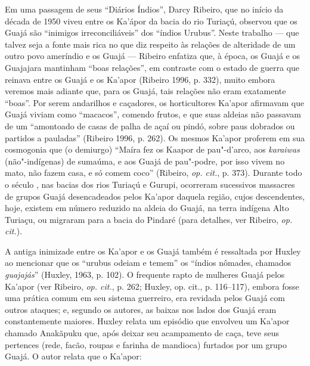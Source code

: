 Em uma passagem de seus ``Diários Índios'', Darcy Ribeiro, que no início
da década de 1950 viveu entre os Ka'ápor da bacia do rio Turiaçú,
observou que os Guajá são ``inimigos irreconciliáveis'' dos ``índios
Urubus''. Neste trabalho --- que talvez seja a fonte mais rica no que diz
respeito às relações de alteridade de um outro povo ameríndio e os Guajá
--- Ribeiro enfatiza que, à época, os Guajá e os Guajajara mantinham ``boas
relações'', em contraste com o estado de guerra que reinava entre os
Guajá e os Ka'apor (Ribeiro 1996, p. 332), muito embora veremos mais
adiante que, para os Guajá, tais relações não eram exatamente ``boas''.
Por serem andarilhos e caçadores, os horticultores Ka'apor afirmavam que
Guajá viviam como ``macacos'', comendo frutos, e que suas aldeias não
passavam de um ``amontoado de casas de palha de açaí ou pindó, sobre
paus dobrados ou partidos a pauladas'' (Ribeiro 1996, p. 262). Os mesmos
Ka'apor proferem em sua cosmogonia que (o demiurgo) ``Maíra fez os Kaapor
de pau"-d'arco, aos \emph{karaiwas} (não"-indígenas) de sumaúma, e aos
Guajá de pau"-podre, por isso vivem no mato, não fazem casa, e só comem
coco'' (Ribeiro, \emph{op. cit.}, p. 373). Durante todo o século , nas bacias
dos rios Turiaçú e Gurupi, ocorreram sucessivos massacres de grupos
Guajá desencadeados pelos Ka'apor daquela região, cujos descendentes,
hoje, existem em número reduzido na aldeia do  Guajá, na terra
indígena Alto Turiaçu, ou migraram para a bacia do Pindaré (para
detalhes, ver Ribeiro, \emph{op. cit.}).

A antiga inimizade entre os Ka'apor e os Guajá também é ressaltada por
Huxley ao mencionar que os ``urubus odeiam e temem'' os ``índios nômades,
chamados \emph{guajajás}'' (Huxley, 1963, p. 102). O frequente rapto de
mulheres Guajá pelos Ka'apor (ver Ribeiro, \emph{op. cit.}, p. 262; Huxley, op.
cit., p. 116--117), embora fosse uma prática comum em seu sistema
guerreiro, era revidada pelos Guajá com outros ataques; e, segundo os
autores, as baixas nos lados dos Guajá eram constantemente maiores.
Huxley relata um episódio que envolveu um Ka'apor chamado Anakãpuku que,
após deixar seu acampamento de caça, teve seus pertences (rede, facão,
roupas e farinha de mandioca) furtados por um grupo Guajá. O autor
relata que o Ka'apor:


